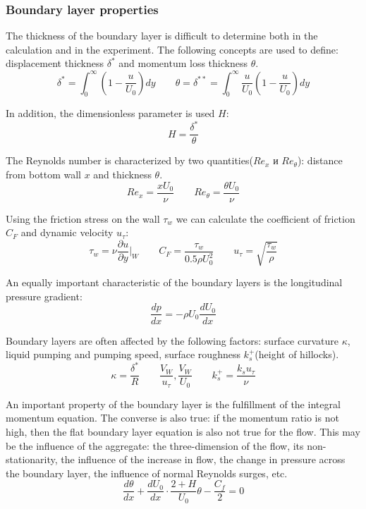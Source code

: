 \subsubsection{Boundary layer properties}
	The thickness of the boundary layer is difficult to determine both in the calculation and in the experiment. The following concepts are used to define: displacement thickness $\delta^*$ and momentum loss thickness $\theta$.
	\begin{equation}
		\delta^* = \int_{0}^{\infty}(1 - \frac{u}{U_0})dy \qquad \theta = \delta^{**} = \int_{0}^{\infty} \frac{u}{U_0}(1 - \frac{u}{U_0})dy
	\end{equation}

	In addition, the dimensionless parameter is used $H$:
	\begin{equation}
		H = \frac{\delta^*}{\theta}
	\end{equation}

	The Reynolds number is characterized by two quantities($Re_x$ и $Re_\theta$): distance from bottom wall $x$ and thickness $\theta$.
	\begin{equation}
		Re_x = \frac{xU_0}{\nu} \qquad Re_\theta = \frac{\theta U_0}{\nu}
	\end{equation}

	Using the friction stress on the wall $\tau_w$ we can calculate the coefficient of friction $C_F$ and dynamic velocity $u_\tau$:
	\begin{equation}
		\tau_w = \nu\frac{\partial u}{\partial y}\bigg|_W \qquad C_F = \frac{\tau_w}{0.5\rho U_0^2} \qquad u_\tau = \sqrt{\frac{\tau_w}{\rho}}
	\end{equation}
	
	An equally important characteristic of the boundary layers is the longitudinal pressure gradient:
	\begin{equation}
		\frac{dp}{dx} = -\rho U_0 \frac{dU_0}{dx}
	\end{equation}
	
	Boundary layers are often affected by the following factors: surface curvature $\kappa$, liquid pumping and pumping speed, surface roughness $k_s^+$(height of hillocks).
	\begin{equation}
		\kappa = \frac{\delta^*}{R} \qquad \frac{V_W}{u_\tau}, \frac{V_W}{U_0} \qquad k_s^+ = \frac{k_s u_\tau}{\nu}
	\end{equation}

	An important property of the boundary layer is the fulfillment of the integral momentum equation. The converse is also true: if the momentum ratio is not high, then the flat boundary layer equation is also not true for the flow. This may be the influence of the aggregate: the three-dimension of the flow, its non-stationarity, the influence of the increase in flow, the change in pressure across the boundary layer, the influence of normal Reynolds surges, etc.
	\begin{equation}
		\frac{d\theta}{dx} + \frac{dU_0}{dx}\cdot\frac{2 + H}{U_0}\theta - \frac{C_f}{2} = 0
	\end{equation}
	
